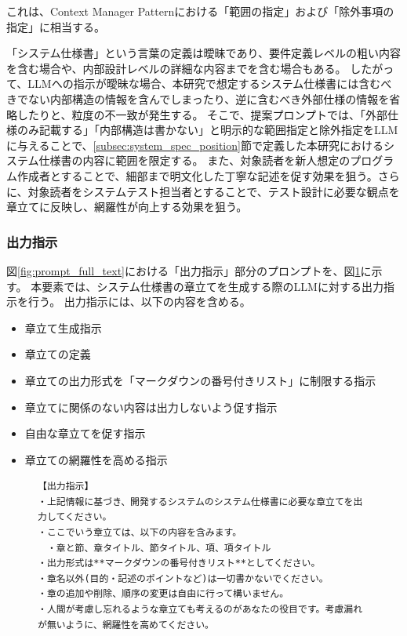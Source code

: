 これは、Context Manager Patternにおける「範囲の指定」および「除外事項の指定」に相当する。

「システム仕様書」という言葉の定義は曖昧であり、要件定義レベルの粗い内容を含む場合や、内部設計レベルの詳細な内容までを含む場合もある\cite{software_engineering}。
したがって、LLMへの指示が曖昧な場合、本研究で想定するシステム仕様書には含むべきでない内部構造の情報を含んでしまったり、逆に含むべき外部仕様の情報を省略したりと、粒度の不一致が発生する。
そこで、提案プロンプトでは、「外部仕様のみ記載する」「内部構造は書かない」と明示的な範囲指定と除外指定をLLMに与えることで、\ref{subsec:system_spec_position}節で定義した本研究におけるシステム仕様書の内容に範囲を限定する。
また、対象読者を新人想定のプログラム作成者とすることで、細部まで明文化した丁寧な記述を促す効果を狙う。さらに、対象読者をシステムテスト担当者とすることで、テスト設計に必要な観点を章立てに反映し、網羅性が向上する効果を狙う。

\subsubsection{出力指示}

図\ref{fig:prompt_full_text}における「出力指示」部分のプロンプトを、図\ref{fig:output_instruction}に示す。
本要素では、システム仕様書の章立てを生成する際のLLMに対する出力指示を行う。
出力指示には、以下の内容を含める。
\begin{itemize}
  \item 章立て生成指示
  \item 章立ての定義
  \item 章立ての出力形式を「マークダウンの番号付きリスト」に制限する指示
  \item 章立てに関係のない内容は出力しないよう促す指示
  \item 自由な章立てを促す指示
  \item 章立ての網羅性を高める指示
\end{itemize}


\begin{figure}[tp]
\begin{tcolorbox}[
  colback=white,
  colframe=blue,
  fonttitle=\bfseries,
]
\footnotesize
\ttfamily
\fontsize{10}{11}\selectfont
\begin{verbatim}
【出力指示】
・上記情報に基づき、開発するシステムのシステム仕様書に必要な章立てを出力してください。
・ここでいう章立ては、以下の内容を含みます。
　・章と節、章タイトル、節タイトル、項、項タイトル 
・出力形式は**マークダウンの番号付きリスト**としてください。 
・章名以外(目的・記述のポイントなど)は一切書かないでください。 
・章の追加や削除、順序の変更は自由に行って構いません。
・人間が考慮し忘れるような章立ても考えるのがあなたの役目です。考慮漏れが無いように、網羅性を高めてください。
\end{verbatim}
\end{tcolorbox}
\par\vspace{-20pt}
\label{fig:output_instruction}
\end{figure}


